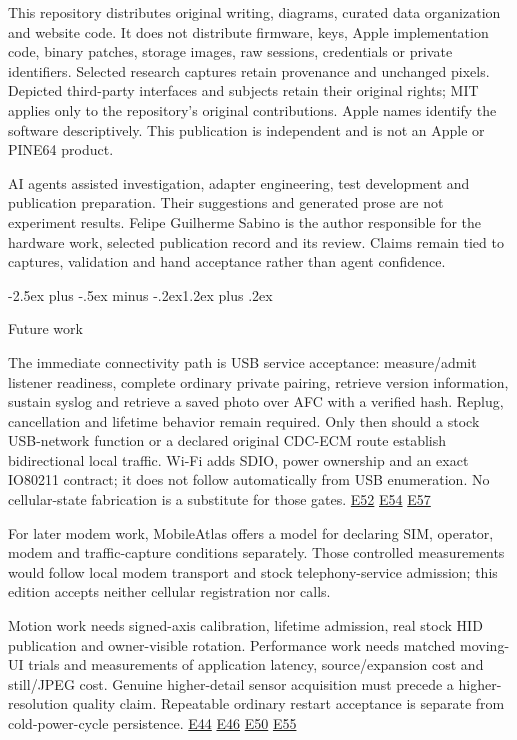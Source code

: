 \documentclass[10pt,letterpaper,twocolumn]{article}
\makeatletter
\renewcommand{\section}{\@startsection{section}{1}{0pt}
  {-2.5ex plus -.5ex minus -.2ex}{1.2ex plus .2ex}
  {\normalfont\large\bfseries\raggedright}}
\makeatother
\begin{document}
This repository distributes original writing, diagrams, curated data organization and website code. It does not distribute firmware, keys, Apple implementation code, binary patches, storage images, raw sessions, credentials or private identifiers. Selected research captures retain provenance and unchanged pixels. Depicted third-party interfaces and subjects retain their original rights; MIT applies only to the repository's original contributions. Apple names identify the software descriptively. This publication is independent and is not an Apple or PINE64 product.

AI agents assisted investigation, adapter engineering, test development and publication preparation. Their suggestions and generated prose are not experiment results. Felipe Guilherme Sabino is the author responsible for the hardware work, selected publication record and its review. Claims remain tied to captures, validation and hand acceptance rather than agent confidence.

\section{Future work}

The immediate connectivity path is USB service acceptance: measure/admit listener readiness, complete ordinary private pairing, retrieve version information, sustain syslog and retrieve a saved photo over AFC with a verified hash. Replug, cancellation and lifetime behavior remain required. Only then should a stock USB-network function or a declared original CDC-ECM route establish bidirectional local traffic. Wi-Fi adds SDIO, power ownership and an exact IO80211 contract; it does not follow automatically from USB enumeration. No cellular-state fabrication is a substitute for those gates. \hyperlink{e-E52}{\textsf{E52}} \hyperlink{e-E54}{\textsf{E54}} \hyperlink{e-E57}{\textsf{E57}}

For later modem work, MobileAtlas offers a model for declaring SIM, operator, modem and traffic-capture conditions separately. Those controlled measurements would follow local modem transport and stock telephony-service admission; this edition accepts neither cellular registration nor calls. \cite{ref-21}

Motion work needs signed-axis calibration, lifetime admission, real stock HID publication and owner-visible rotation. Performance work needs matched moving-UI trials and measurements of application latency, source/expansion cost and still/JPEG cost. Genuine higher-detail sensor acquisition must precede a higher-resolution quality claim. Repeatable ordinary restart acceptance is separate from cold-power-cycle persistence. \hyperlink{e-E44}{\textsf{E44}} \hyperlink{e-E46}{\textsf{E46}} \hyperlink{e-E50}{\textsf{E50}} \hyperlink{e-E55}{\textsf{E55}}
\end{document}
